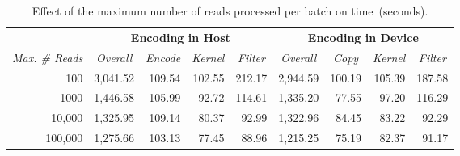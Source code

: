 \begin{table}[!htbp]
\caption{Effect of the maximum number of reads processed per batch on time~(seconds).}
\label{tab:maxnumreads}
\begin{adjustbox}{max width=0.49\textwidth}
\Large
\begin{tabular}{r|rrrr|rrrr}
\multicolumn{1}{c}{}                          & \multicolumn{4}{c}{\textbf{Encoding in Host}}                                                                                                            & \multicolumn{4}{c}{\textbf{Encoding in Device} }                                                                                                           \\
\multicolumn{1}{c|}{ \textit{Max. \# Reads} } & \multicolumn{1}{c}{\textit{Overall} } & \multicolumn{1}{c}{\textit{Encode }} & \multicolumn{1}{c}{\textit{Kernel }} & \multicolumn{1}{c|}{\textit{Filter} } & \multicolumn{1}{c}{\textit{Overall} } & \multicolumn{1}{c}{\textit{Copy} } & \multicolumn{1}{c}{\textit{Kernel }} & \multicolumn{1}{c}{\textit{Filter} }  \\ 
\hline \rule{0pt}{2ex}
100                                           & 3,041.52                              & 109.54                               & 102.55                               & 212.17                                & 2,944.59                              & 100.19                             & 105.39                               & 187.58                                \\
1000                                          & 1,446.58                              & 105.99                               & 92.72                                & 114.61                                & 1,335.20                              & 77.55                              & 97.20                                & 116.29                                \\
10,000                                        & 1,325.95                              & 109.14                               & 80.37                                & 92.99                                 & 1,322.96                              & 84.45                              & 83.22                                & 92.29                                 \\
100,000                                       & 1,275.66                              & 103.13                               & 77.45                                & 88.96                                 & 1,215.25                              & 75.19                              & 82.37                                & 91.17                                \\

\end{tabular}
\end{adjustbox}
\end{table}
